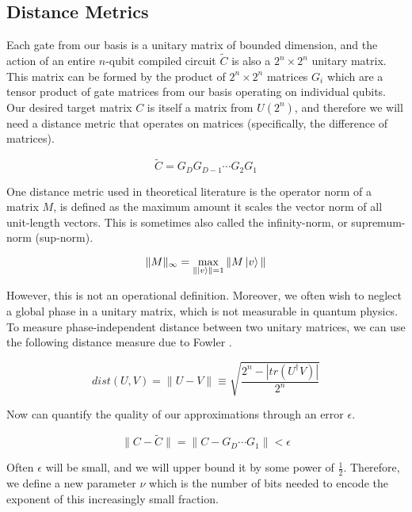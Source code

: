 \subsection{Distance Metrics}
\label{subsec:distance}

Each gate from our basis is a unitary matrix of bounded dimension, and the action of an entire
$n$-qubit compiled circuit $\tilde{C}$
is also a $2^n \times 2^n$ unitary matrix. This matrix can be formed
by the product of $2^n \times 2^n$ matrices $G_i$ which are a tensor
product of gate matrices from our basis operating on individual qubits.
Our desired target matrix $C$ is itself
a matrix from $U(2^n)$, and therefore we will need a distance metric
that operates on matrices (specifically, the difference of matrices).

\begin{equation}
\tilde{C} = G_{D}G_{D-1}\cdots G_{2} G_{1}
\end{equation}

One distance metric used in theoretical literature
is the operator norm of a matrix $M$,
is defined as the maximum amount it scales the vector norm
of all unit-length vectors. This is sometimes also called the
infinity-norm, or supremum-norm (sup-norm).

\begin{equation}
\| M \|_{\infty} = \max_{\| \left\vert{v}\right\rangle \| = 1} \| M \left\vert{v}\right\rangle \|
\end{equation}

However, this is not an operational definition.
Moreover, we often wish to neglect a global phase in a unitary matrix,
which is not measurable in quantum physics. To measure phase-independent
distance between two unitary matrices, we can use the following
distance measure due to Fowler \cite{Fowler2011}.

\begin{equation}
dist(U, V) = \| U - V\| \equiv \sqrt{\frac{2^n - |tr(U^{\dag}V)|}{2^n}}
\end{equation}

Now can quantify the quality of our approximations through an
error $\epsilon$.

\begin{equation}
\| C - \tilde{C}\| = \| C -  G_D\cdots G_1 \| < \epsilon
\end{equation}

Often $\epsilon$ will be small, and we will upper bound it by some
power of $\frac{1}{2}$. Therefore, we define a
new parameter $\nu$ which is the number of bits needed to encode the exponent
of this increasingly small fraction.


